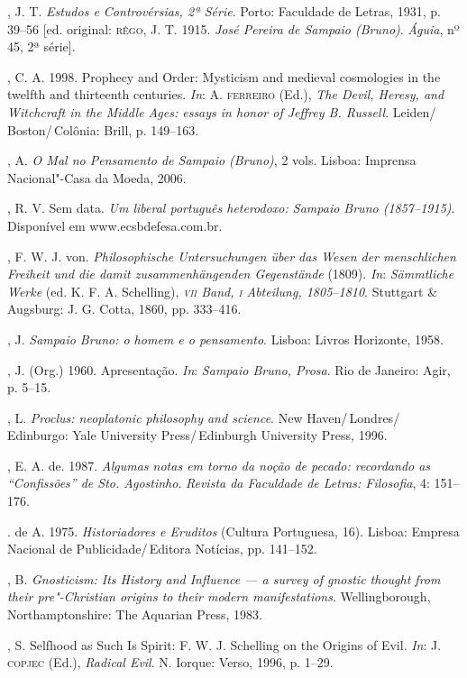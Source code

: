 \begin{description}
, J. T. \textit{Estudos e Controvérsias, 2ª Série}. Porto:
Faculdade de Letras, 1931, p. 39--56 [ed. original: \textsc{rêgo}, J. T.
1915. \textit{José Pereira de Sampaio (Bruno)}. \emph{Águia},
nº 45, 2ª série].

, C. A. 1998. Prophecy and Order: Mysticism and medieval
cosmologies in the twelfth and thirteenth centuries.
\emph{In}: A. \textsc{ferreiro} (Ed.), \textit{The Devil, Heresy, and
Witchcraft in the Middle Ages: essays in honor of Jeffrey B.
Russell}. Leiden/\,Boston/\,Colônia: Brill, p. 149--163.

, A. \textit{O Mal no Pensamento de Sampaio (Bruno)}, 2
vols. Lisboa: Imprensa Nacional"-Casa da Moeda, 2006.

, R. V. Sem data. \textit{Um liberal português
heterodoxo: Sampaio Bruno (1857--1915)}. Disponível em
www.ecsbdefesa.com.br.

, F. W. J. von. \textit{Philosophische
Untersuchungen über das Wesen der menschlichen Freiheit und die
damit zusammenhängenden Gegenstände} (1809). \emph{In}:
\textit{Sämmtliche Werke} (ed. K. F. A. Schelling),
\textit{\textsc{vii}
Band, \textsc{i} Abteilung, 1805--1810}. Stuttgart \& Augsburg: J. G.
Cotta, 1860, pp. 333--416.

, J. \textit{Sampaio Bruno: o homem e o pensamento}.
Lisboa: Livros Horizonte, 1958.

, J. (Org.) 1960. Apresentação. \emph{In}:
\textit{Sampaio Bruno, Prosa}. Rio de Janeiro: Agir, p. 5--15.

, L. \textit{Proclus: neoplatonic philosophy and
science}. New Haven/\,Londres/\,Edinburgo: Yale University
Press/\,Edinburgh University Press, 1996.

, E. A. de. 1987. \textit{Algumas notas em torno da noção
de pecado: recordando as “Confissões” de Sto. Agostinho}.
\emph{Revista da Faculdade de Letras: Filosofia}, 4: 151--176.

. de A. 1975. \textit{Historiadores e Eruditos} (Cultura
Portuguesa, 16). Lisboa: Empresa Nacional de Publicidade/\,Editora
Notícias, pp. 141--152.

, B. \textit{Gnosticism: Its History and Influence --- a
survey of gnostic thought from their pre"-Christian origins to
their modern manifestations}. Wellingborough, Northamptonshire:
The Aquarian Press, 1983.

, S. Selfhood as Such Is Spirit: F. W. J. Schelling on the
Origins of Evil. \emph{In}: J. \textsc{copjec} (Ed.), \textit{Radical
Evil}. N. Iorque: Verso, 1996, p. 1--29.
\end{description}



